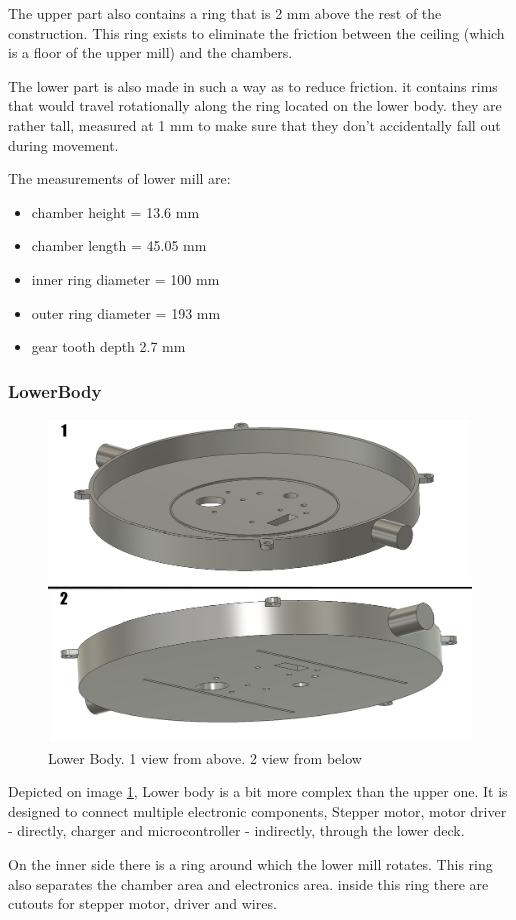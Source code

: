 The upper part also contains a ring that is 2 mm above the rest of the construction. This ring exists to eliminate the friction between the ceiling (which is a floor of the upper mill) and the chambers. 

The lower part is also made in such a way as to reduce friction. it contains rims that would travel rotationally along the ring located on the lower body. they are rather tall, measured at 1 mm to make sure that they don't accidentally fall out during movement.

The measurements of lower mill are:
\begin{itemize}
	\item chamber height = 13.6 mm
	\item chamber length = 45.05 mm
	\item inner ring diameter = 100 mm
	\item outer ring diameter = 193 mm
	\item gear tooth depth 2.7 mm
\end{itemize}
\newpage
\subsubsection{LowerBody}
\begin{figure}[h]
	\centering
	\includegraphics[width=0.7\linewidth]{Figures/Lowerbody}
	\caption[Lower Body]{Lower Body. 1 view from above. 2 view from below}
	\label{fig:lowerbody}
\end{figure}
Depicted on image \ref{fig:lowerbody}, Lower body is a bit more complex than the upper one. It is designed to connect multiple electronic components, Stepper motor, motor driver - directly, charger and microcontroller - indirectly, through the lower deck.

On the inner side there is a ring around which the lower mill rotates. This ring also separates the chamber area and electronics area. inside this ring there are cutouts for stepper motor, driver and wires.

